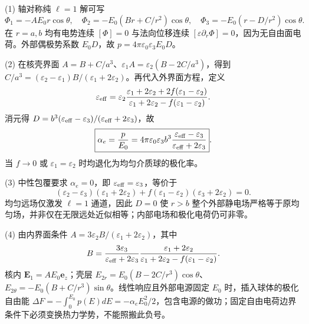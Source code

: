 (1) 轴对称纯 \(\ell=1\) 解可写
\[
\Phi_1=-AE_0r\cos\theta,\quad
\Phi_2=-E_0(Br+C/r^2)\cos\theta,\quad
\Phi_3=-E_0(r-D/r^2)\cos\theta .
\]
在 \(r=a,b\) 均有电势连续 \([\Phi]=0\) 与法向位移连续 \([\varepsilon\partial_r\Phi]=0\)，因为无自由面电荷。外部偶极势系数 \(E_0D\)，故 \(p=4\pi\varepsilon_0\varepsilon_3E_0D\)。

(2) 在核壳界面 \(A=B+C/a^3\)、\(\varepsilon_1A=\varepsilon_2(B-2C/a^3)\)，得到 \(C/a^3=(\varepsilon_2-\varepsilon_1)B/(\varepsilon_1+2\varepsilon_2)\)。再代入外界面方程，定义
\[
\varepsilon_{\rm eff}=\varepsilon_2
\frac{\varepsilon_1+2\varepsilon_2+2f(\varepsilon_1-\varepsilon_2)}
{\varepsilon_1+2\varepsilon_2-f(\varepsilon_1-\varepsilon_2)}.
\]
消元得 \(D=b^3(\varepsilon_{\rm eff}-\varepsilon_3)/(\varepsilon_{\rm eff}+2\varepsilon_3)\)，故
\[
\boxed{\alpha_e=\frac p{E_0}=4\pi\varepsilon_0\varepsilon_3b^3
\frac{\varepsilon_{\rm eff}-\varepsilon_3}{\varepsilon_{\rm eff}+2\varepsilon_3}}.
\]
当 \(f\to0\) 或 \(\varepsilon_1=\varepsilon_2\) 时均退化为均匀介质球的极化率。

(3) 中性包覆要求 \(\alpha_e=0\)，即 \(\varepsilon_{\rm eff}=\varepsilon_3\)，等价于
\[
(\varepsilon_2-\varepsilon_3)(\varepsilon_1+2\varepsilon_2)
+f(\varepsilon_1-\varepsilon_2)(\varepsilon_3+2\varepsilon_2)=0.
\]
均匀远场仅激发 \(\ell=1\) 通道，因此 \(D=0\) 使 \(r>b\) 整个外部静电场严格等于原均匀场，并非仅在无限远处近似相等；内部电场和极化电荷仍可非零。

(4) 由内界面条件 \(A=3\varepsilon_2B/(\varepsilon_1+2\varepsilon_2)\)，其中
\[
B=\frac{3\varepsilon_3}{\varepsilon_{\rm eff}+2\varepsilon_3}
\frac{\varepsilon_1+2\varepsilon_2}{\varepsilon_1+2\varepsilon_2-f(\varepsilon_1-\varepsilon_2)}.
\]
核内 \(\boldsymbol E_1=AE_0\boldsymbol e_z\)；壳层 \(E_{2r}=E_0(B-2C/r^3)\cos\theta\)、\(E_{2\theta}=-E_0(B+C/r^3)\sin\theta\)。线性响应且外部电源固定 \(E_0\) 时，插入球体的极化自由能 \(\Delta F=-\int_0^{E_0}p(E)dE=-\alpha_eE_0^2/2\)，包含电源的做功；固定自由电荷边界条件下必须变换热力学势，不能照搬此负号。
